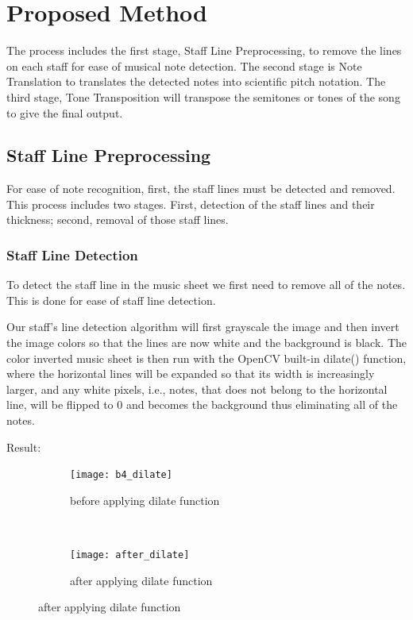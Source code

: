 \documentclass[final]{cvpr}
\begin{document}
\section{Proposed Method}
The process includes the first stage, Staff Line Preprocessing, to remove the
lines on each staff for ease of musical note detection. The second stage is Note
Translation to translates the detected notes into scientific pitch notation. The
third stage, Tone Transposition will transpose the semitones or tones of the
song to give the final output. 

\subsection{Staff Line Preprocessing}
For ease of note recognition, first, the staff lines must be detected and
removed. This process includes two stages. First, detection of the staff lines
and their thickness; second, removal of those staff lines.

\subsubsection{Staff Line Detection}
To detect the staff line in the music sheet we first need to remove all of the notes.
This is done for ease of staff line detection.

Our staff's line detection algorithm will first grayscale the image and then
invert the image colors so that the lines are now white and the background is
black. The color inverted music sheet is then run with the OpenCV built-in
dilate() function, where the horizontal lines will be expanded so that its width
is increasingly larger, and any white pixels, i.e., notes, that does not belong
to the horizontal line, will be flipped to 0 and becomes the background thus
eliminating all of the notes.

Result:
\begin{figure}[H]
    \centering
    \begin{subfigure}[t]{0.2\textwidth}
        \centering
        \texttt{[image: b4\_dilate]}
        \caption{before applying dilate function}
    \end{subfigure}%
    ~ 
    \begin{subfigure}[t]{0.2\textwidth}
        \centering
        \texttt{[image: after\_dilate]}
        \caption{after applying dilate function}
    \end{subfigure}
\end{figure}
\end{document}
